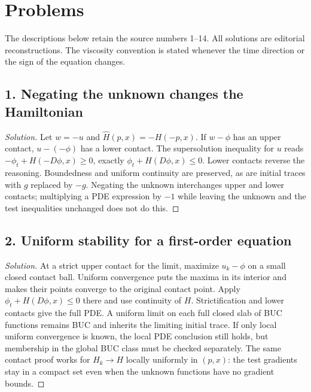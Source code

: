 \section{Problems}
\label{sec:10-4}
The descriptions below retain the source numbers 1--14. All solutions are
editorial reconstructions. The viscosity convention is stated whenever the
time direction or the sign of the equation changes.

\subsection*{1. Negating the unknown changes the Hamiltonian}
\begin{proof}[Solution]
Let $w=-u$ and $\widehat H(p,x)=-H(-p,x)$. If $w-\phi$ has an
upper contact, $u-(-\phi)$ has a lower contact. The supersolution
inequality for $u$ reads
$-\phi_t+H(-D\phi,x)\geq0$, exactly
$\phi_t+\widehat H(D\phi,x)\leq0$. Lower contacts reverse the reasoning.
Boundedness and uniform continuity are preserved, as are initial traces
with $g$ replaced by $-g$. Negating the unknown interchanges upper and
lower contacts; multiplying a PDE expression by $-1$ while leaving the
unknown and the test inequalities unchanged does not do this.
\end{proof}

\subsection*{2. Uniform stability for a first-order equation}
\begin{proof}[Solution]
At a strict upper contact for the limit, maximize $u_k-\phi$ on a small
closed contact ball. Uniform convergence puts the maxima in its interior
and makes their points converge to the original contact point. Apply
$\phi_t+H(D\phi,x)\leq0$ there and use continuity of $H$.
Strictification and lower contacts give the full PDE. A uniform limit
on each full closed slab of BUC functions remains BUC and inherits the
limiting initial trace. If only local uniform convergence is known,
the local PDE conclusion still holds, but membership in the global BUC
class must be checked separately. The same contact proof works for
$H_k\to H$ locally uniformly in $(p,x)$: the test gradients stay in a
compact set even when the unknown functions have no gradient bounds.
\end{proof}

